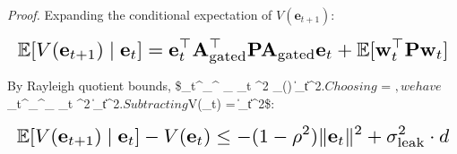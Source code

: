 \documentclass[10pt,journal,compsoc,twocolumn]{IEEEtran}
\begin{document}
\textit{Proof.} Expanding the conditional expectation of $V(\mathbf{e}_{t+1})$:





















\begin{equation}
\resizebox{\columnwidth}{!}{$\displaystyle
\begin{aligned}
\mathbb{E}[V(\mathbf{e}_{t+1}) \mid \mathbf{e}_t] = \mathbf{e}_t^\top \mathbf{A}_{\text{gated}}^\top \mathbf{P} \mathbf{A}_{\text{gated}} \mathbf{e}_t + \mathbb{E}[\mathbf{w}_t^\top \mathbf{P} \mathbf{w}_t]
\end{aligned}
$}
\end{equation}





















By Rayleigh quotient bounds, \$\_t^\top {}\_{}^\top {} \_{} \_t \le \rho^2 \lambda\_{\max}() \|\_t\|^2$. Choosing $ = $, we have $\_t^\top {}\_{}^\top {}\_{} \_t \le \rho^2 \|\_t\|^2$. Subtracting $V(\_t) = \|\_t\|^2\$:





















\begin{equation}
\resizebox{\columnwidth}{!}{$\displaystyle
\begin{aligned}
\mathbb{E}[V(\mathbf{e}_{t+1}) \mid \mathbf{e}_t] - V(\mathbf{e}_t) \le -(1 - \rho^2) \|\mathbf{e}_t\|^2 + \sigma_{\text{leak}}^2 \cdot d
\end{aligned}
$}
\end{equation}
\end{document}
